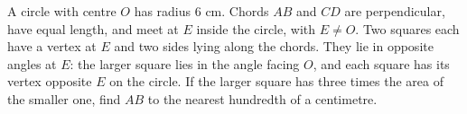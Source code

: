 A circle with centre $O$ has radius $6$ cm. Chords $AB$ and $CD$ are perpendicular, have equal length, and meet at $E$ inside the circle, with $E\ne O$. Two squares each have a vertex at $E$ and two sides lying along the chords. They lie in opposite angles at $E$: the larger square lies in the angle facing $O$, and each square has its vertex opposite $E$ on the circle. If the larger square has three times the area of the smaller one, find $AB$ to the nearest hundredth of a centimetre.
